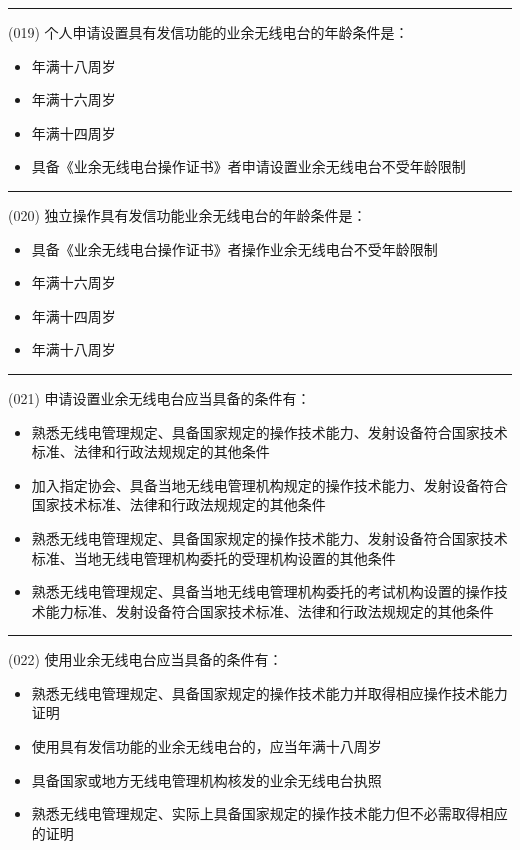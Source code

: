 \documentclass[twocolumn]{ctexart}  %
\begin{document}
\noindent\rule{0.5\textwidth}{1pt}
\heiti (019) 个人申请设置具有发信功能的业余无线电台的年龄条件是： \songti {\color{gray} [LK0026] }
\begin{itemize}
	\item  年满十八周岁
	\item  年满十六周岁
	\item  年满十四周岁
	\item  具备《业余无线电台操作证书》者申请设置业余无线电台不受年龄限制
\end{itemize}


\noindent\rule{0.5\textwidth}{1pt}
\heiti (020) 独立操作具有发信功能业余无线电台的年龄条件是： \songti {\color{gray} [LK0027] }
\begin{itemize}
	\item  具备《业余无线电台操作证书》者操作业余无线电台不受年龄限制
	\item  年满十六周岁
	\item  年满十四周岁
	\item  年满十八周岁
\end{itemize}


\noindent\rule{0.5\textwidth}{1pt}
\heiti (021) 申请设置业余无线电台应当具备的条件有： \songti {\color{gray} [LK0041] }
\begin{itemize}
	\item  熟悉无线电管理规定、具备国家规定的操作技术能力、发射设备符合国家技术标准、法律和行政法规规定的其他条件
	\item  加入指定协会、具备当地无线电管理机构规定的操作技术能力、发射设备符合国家技术标准、法律和行政法规规定的其他条件
	\item  熟悉无线电管理规定、具备国家规定的操作技术能力、发射设备符合国家技术标准、当地无线电管理机构委托的受理机构设置的其他条件
	\item  熟悉无线电管理规定、具备当地无线电管理机构委托的考试机构设置的操作技术能力标准、发射设备符合国家技术标准、法律和行政法规规定的其他条件
\end{itemize}


\noindent\rule{0.5\textwidth}{1pt}
\heiti (022) 使用业余无线电台应当具备的条件有： \songti {\color{gray} [LK0042] }
\begin{itemize}
	\item  熟悉无线电管理规定、具备国家规定的操作技术能力并取得相应操作技术能力证明
	\item  使用具有发信功能的业余无线电台的，应当年满十八周岁
	\item  具备国家或地方无线电管理机构核发的业余无线电台执照
	\item  熟悉无线电管理规定、实际上具备国家规定的操作技术能力但不必需取得相应的证明
\end{itemize}
\end{document}
